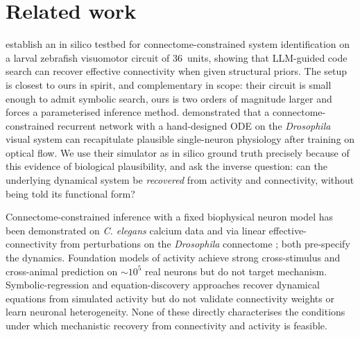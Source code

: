 \documentclass{article}
\begin{document}
\section{Related work}

\citet{lueckmann_discovering_2026} establish an in silico testbed for connectome-constrained system identification on a larval zebrafish visuomotor circuit of 36~units, showing that LLM-guided code search can recover effective connectivity when given structural priors.
The setup is closest to ours in spirit, and complementary in scope: their circuit is small enough to admit symbolic search, ours is two orders of magnitude larger and forces a parameterised inference method.
\citet{lappalainen_connectome-constrained_2024} demonstrated that a connectome-constrained recurrent network with a hand-designed ODE on the \emph{Drosophila} visual system can recapitulate plausible single-neuron physiology after training on optical flow.
We use their simulator as in silico ground truth precisely because of this evidence of biological plausibility, and ask the inverse question: can the underlying dynamical system be \emph{recovered} from activity and connectivity, without being told its functional form?

Connectome-constrained inference with a fixed biophysical neuron model has been demonstrated on \emph{C. elegans} calcium data \citep{mi_connectome-constrained_2021} and via linear effective-connectivity from perturbations on the \emph{Drosophila} connectome \citep{pospisil_fly_2024}; both pre-specify the dynamics.
Foundation models of activity \citep{wang_foundation_2025} achieve strong cross-stimulus and cross-animal prediction on $\sim 10^5$ real neurons but do not target mechanism.
Symbolic-regression and equation-discovery approaches \citep{yu_discovering_2025,prasse_predicting_2022} recover dynamical equations from simulated activity but do not validate connectivity weights or learn neuronal heterogeneity.
None of these directly characterises the conditions under which mechanistic recovery from connectivity and activity is feasible.
\end{document}
